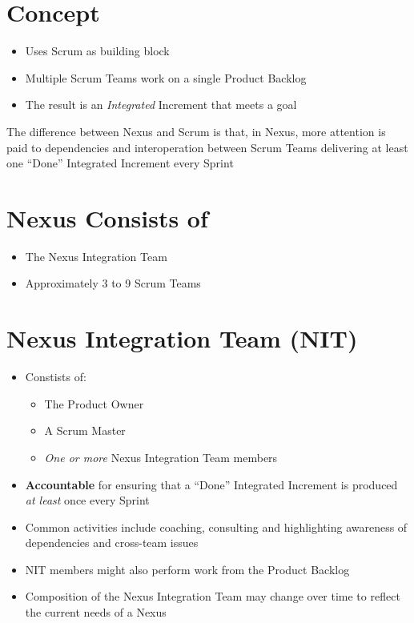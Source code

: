 \documentclass[a4paper,11pt,twocolumn]{article}
\begin{document}
\section*{Concept}
\begin{itemize}
	\item Uses Scrum as building block
	\item Multiple Scrum Teams work on a single Product Backlog
	\item The result is an \textit{Integrated} Increment that meets a goal
\end{itemize}

\begin{tcolorbox}[colback=black!8!white,colframe=gray!50!black,title=Note,sharp corners,fonttitle=\normalsize\bfseries,fontupper=\normalsize]
	The difference between Nexus and Scrum is that, in Nexus, more attention is paid to dependencies and interoperation between Scrum Teams delivering at least one ``Done'' Integrated Increment every Sprint
\end{tcolorbox}

\section*{Nexus Consists of}
\begin{itemize}
	\item The Nexus Integration Team
	\item Approximately 3 to 9 Scrum Teams
\end{itemize}

\section*{Nexus Integration Team (NIT)}
\begin{itemize}
	\item Constists of:
	\begin{itemize}
		\item The Product Owner
		\item A Scrum Master
		\item \textit{One or more} Nexus Integration Team members
	\end{itemize}
	\item \textbf{Accountable} for ensuring that a ``Done'' Integrated Increment is produced \textit{at least} once every Sprint
	\item Common activities include coaching, consulting and highlighting awareness of dependencies and cross-team issues
	\item NIT members might also perform work from the Product Backlog
	\item Composition of the Nexus Integration Team may change over time to reflect the current needs of a Nexus
\end{itemize}
\end{document}
